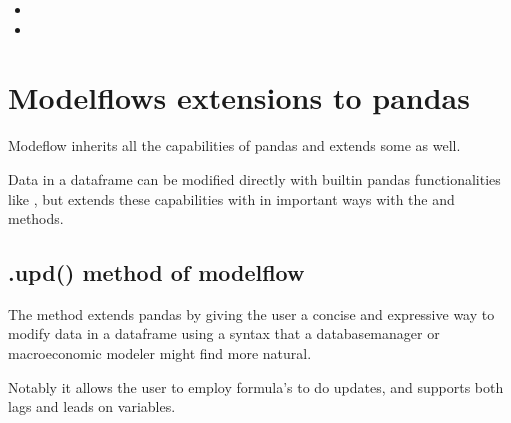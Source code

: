\documentclass[letterpaper,10pt,english]{jupyterBook}
\begin{document}
\sphinxAtStartPar
{}
\begin{itemize}
\item {} 
\sphinxAtStartPar
{}

\item {} 
\sphinxAtStartPar
{}

\end{itemize}

\sphinxstepscope


\chapter{Modelflows extensions to pandas}
\label{\detokenize{content/04_PythonEssentials/UpdateCommand:modelflows-extensions-to-pandas}}\label{\detokenize{content/04_PythonEssentials/UpdateCommand::doc}}
\sphinxAtStartPar
Modeflow inherits all the capabilities of pandas and extends some as well.

\sphinxAtStartPar
Data in a dataframe can be modified directly with built\sphinxhyphen{}in pandas functionalities like , but  extends these capabilities with in important ways with the  and  methods.


\section{.upd() method of modelflow}
\label{\detokenize{content/04_PythonEssentials/UpdateCommand:upd-method-of-modelflow}}
\sphinxAtStartPar
The  method extends pandas by giving the user a concise and expressive way to modify data in a dataframe using a syntax that a database\sphinxhyphen{}manager or macroeconomic modeler might find more natural.

\sphinxAtStartPar
Notably it allows the user to employ formula’s to do updates, and supports both lags and leads on variables.
\end{document}
